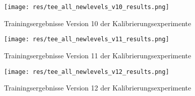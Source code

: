 \documentclass[11pt]{scrartcl}
\begin{document}
\begin{figure}[htp]
\centering
\texttt{[image: res/tee\_all\_newlevels\_v10\_results.png]}
\caption{Trainingsergebnisse Version 10 der Kalibrierungsexperimente}
\end{figure}

\begin{figure}[htp]
\centering
\texttt{[image: res/tee\_all\_newlevels\_v11\_results.png]}
\caption{Trainingsergebnisse Version 11 der Kalibrierungsexperimente}
\end{figure}

\begin{figure}[htp]
\centering
\texttt{[image: res/tee\_all\_newlevels\_v12\_results.png]}
\caption{Trainingsergebnisse Version 12 der Kalibrierungsexperimente}
\end{figure}
\end{document}
